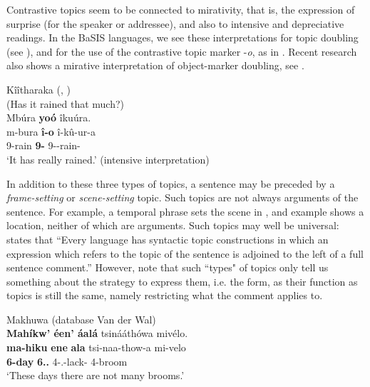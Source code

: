 \documentclass[output=paper]{langscibook}
\begin{document}
\z

Contrastive topics seem to be connected to mirativity, that is, the expression of surprise (for the speaker or addressee), and also to intensive and depreciative readings. In the BaSIS languages, we see these interpretations for topic doubling (see ), and for the use of the contrastive topic marker \nobreakdash-\textit{o}, as in . Recent research also shows a mirative interpretation of object-marker doubling, see \citet{LangadaCâmaraEtAlFut, LippardEtAlFut, SikukuDiercks2021, KerrvanderWal2023}.

\ea
\label{bkm:Ref147299352}
Kîîtharaka (, \cite{chapters/kiitharaka})\\
(Has it rained that much?)\\
 Mbúra \textbf{yoó} îkuúra.\\
\gll
m-bura  \textbf{î-o}  î-kû-ur-a\\
9-rain  \textbf{9-\CM{}}  9\SM-\PRS{}-rain-\FV{}\\
\glt ‘It has really rained.’ (intensive interpretation)\\


\z

In addition to these three types of topics, a sentence may be preceded by a \textit{frame-setting} or \textit{scene-setting} topic. Such topics are not always arguments of the sentence. For example, a temporal phrase sets the scene in , and example  shows a location, neither of which are arguments. Such topics may well be universal: \citet[231]{Gundel1988} states that “Every language has syntactic topic constructions in which an expression which refers to the topic of the sentence is adjoined to the left of a full sentence comment.” However, note that such ``types" of topics only tell us something about the strategy to express them, i.e. the form, as their function as topics is still the same, namely restricting what the comment applies to.

\ea
Makhuwa (database Van der Wal)\\
\label{bkm:Ref145317716}\textbf{Mahíkw’ éen’ áalá} tsinááthówa mivélo.\\
\gll
\textbf{ma-hiku}  \textbf{ene}  \textbf{ala}  tsi-naa-thow-a  mi-velo\\
\textbf{6-day}  \textbf{\INT{}} \textbf{6.\DEM.\PROX{}}  4\SM-\PRS.\DJ{}-lack-\FV{}  4-broom\\
\glt
‘These days there are not many brooms.’\\
\end{document}

